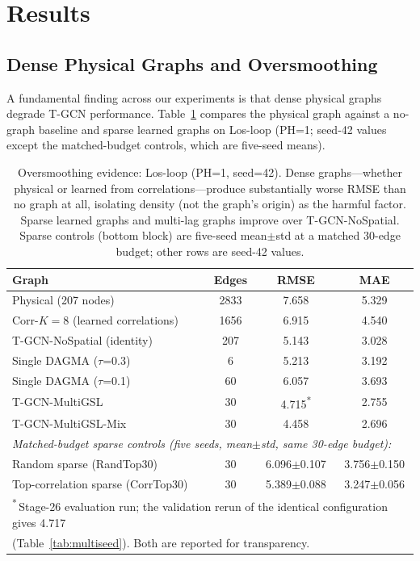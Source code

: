 \section{Results}\label{sec:results}

\subsection{Dense Physical Graphs and Oversmoothing}\label{sec:oversmoothing}

A fundamental finding across our experiments is that dense physical graphs degrade T-GCN performance. Table~\ref{tab:oversmoothing} compares the physical graph against a no-graph baseline and sparse learned graphs on Los-loop (PH=1; seed-42 values except the matched-budget controls, which are five-seed means).

\begin{table}[t]
\centering
\caption{Oversmoothing evidence: Los-loop (PH=1, seed=42). Dense graphs---whether physical or learned from correlations---produce substantially worse RMSE than no graph at all, isolating density (not the graph's origin) as the harmful factor. Sparse learned graphs and multi-lag graphs improve over T-GCN-NoSpatial. Sparse controls (bottom block) are five-seed mean$\pm$std at a matched 30-edge budget; other rows are seed-42 values.}
\label{tab:oversmoothing}
\begin{tabular}{lccc}
\toprule
\textbf{Graph} & \textbf{Edges} & \textbf{RMSE} & \textbf{MAE} \\
\midrule
Physical (207 nodes) & 2833 & 7.658 & 5.329 \\
Corr-$K{=}8$ (learned correlations) & 1656 & 6.915 & 4.540 \\
T-GCN-NoSpatial (identity) & 207 & 5.143 & 3.028 \\
Single DAGMA ($\tau$=0.3) & 6 & 5.213 & 3.192 \\
Single DAGMA ($\tau$=0.1) & 60 & 6.057 & 3.693 \\
T-GCN-MultiGSL & 30 & 4.715\textsuperscript{*} & 2.755 \\
T-GCN-MultiGSL-Mix & 30 & 4.458 & 2.696 \\
\midrule
\multicolumn{4}{l}{\footnotesize \emph{Matched-budget sparse controls (five seeds, mean$\pm$std, same 30-edge budget):}} \\
Random sparse (RandTop30) & 30 & 6.096$\pm$0.107 & 3.756$\pm$0.150 \\
Top-correlation sparse (CorrTop30) & 30 & 5.389$\pm$0.088 & 3.247$\pm$0.056 \\
\bottomrule
\multicolumn{4}{l}{\footnotesize \textsuperscript{*}\,Stage-26 evaluation run; the validation rerun of the identical configuration gives 4.717}\\
\multicolumn{4}{l}{\footnotesize (Table~\ref{tab:multiseed}). Both are reported for transparency.}
\end{tabular}
\end{table}

